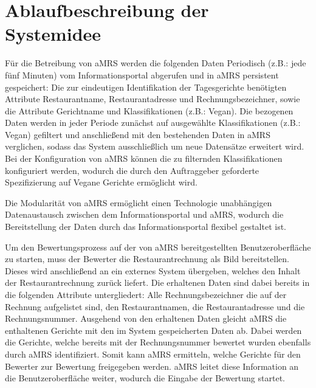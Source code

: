 \section{Ablaufbeschreibung der Systemidee}
Für die Betreibung von \ac{aMRS} werden die folgenden Daten Periodisch (z.B.: jede fünf Minuten) vom Informationsportal abgerufen und in \ac{aMRS} persistent gespeichert:
Die zur eindeutigen Identifikation der Tagesgerichte benötigten Attribute Restaurantname, Restaurantadresse und Rechnungsbezeichner, sowie die Attribute Gerichtname und Klassifikationen (z.B.: Vegan).
Die bezogenen Daten werden in jeder Periode zunächst auf ausgewählte Klassifikationen (z.B.: Vegan) gefiltert und anschließend mit den bestehenden Daten in \ac{aMRS} verglichen, sodass das System ausschließlich um neue Datensätze erweitert wird.
Bei der Konfiguration von \ac{aMRS} können die zu filternden Klassifikationen konfiguriert werden, wodurch die durch den Auftraggeber geforderte Spezifizierung auf Vegane Gerichte ermöglicht wird.

Die Modularität von \ac{aMRS} ermöglicht einen Technologie unabhängigen Datenaustausch zwischen dem Informationsportal und \ac{aMRS}, wodurch die Bereitstellung der Daten durch das Informationsportal flexibel gestaltet ist.

Um den Bewertungsprozess auf der von \ac{aMRS} bereitgestellten Benutzeroberfläche zu starten, muss der Bewerter die Restaurantrechnung als Bild bereitstellen.
Dieses wird anschließend an ein externes System übergeben, welches den Inhalt der Restaurantrechnung zurück liefert.
Die erhaltenen Daten sind dabei bereits in die folgenden Attribute untergliedert: Alle Rechnungsbezeichner die auf der Rechnung aufgelistet sind, den Restaurantnamen, die Restaurantadresse und die Rechnungsnummer.
Ausgehend von den erhaltenen Daten gleicht \ac{aMRS} die enthaltenen Gerichte mit den im System gespeicherten Daten ab.
Dabei werden die Gerichte, welche bereits mit der Rechnungsnummer bewertet wurden ebenfalls durch \ac{aMRS} identifiziert.
Somit kann \ac{aMRS} ermitteln, welche Gerichte für den Bewerter zur Bewertung freigegeben werden.
\ac{aMRS} leitet diese Information an die Benutzeroberfläche weiter, wodurch die Eingabe der Bewertung startet.

